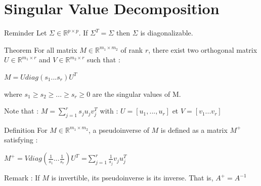 \documentclass[unknownkeysallowed]{beamer}
\begin{document}
\section{Singular Value Decomposition}
\label{sec:conclusion}

\begin{frame}
\begin{block}{Reminder}
Let $\Sigma\in\mathbb{R}^{p \times p}$.
\newline
If   $\Sigma^T=\Sigma$ then $\Sigma$ is diagonalizable.
\end{block}
\begin{alertblock}{Theorem}
For all matrix $M\in\mathbb{R}^{m_1 \times m_2}$ of rank $r$, there exist two orthogonal matrix $U\in \mathbb{R}^{m_1 \times r}$ and $V\in\mathbb{R}^{m_2 \times r}$ such that :
\begin{center}
    $M=U diag(s_{1}...s_{r})U^T$
\end{center}
where $s_{1}\ge s_{2} \ge ... \ge s_{r} \ge 0$ are the singular values of M.
\end{alertblock}
\vspace{0.5cm}
Note that : $M=\sum\limits_{j=1}^r s_{j}u_{j}v_{j}^T$ with : $U=[u_{1},...,u_{r}]$
et $V=[v_{1} ... v_{r}]$
\end{frame}

\begin{frame}
\begin{block}{Definition}
For $M\in\mathbb{R}^{m_1 \times m_2}$, a pseudoinverse of $M$ is defined as a matrix $M^{+}$ satisfying :
\begin{center}
    $M^{+}=Vdiag(\frac{1}{s_{1}} ... \frac{1}{s_{r}})U^T$
    =$\sum\limits_{j=1}^r \frac{1}{s_{j}}v_{j}u_{j}^T$
\end{center}
\end{block}
\vspace{0.5cm}
Remark : If $M$ is invertible, its pseudoinverse is its inverse. That is, $A^{+}=A^{-1}$
\end{frame}
\end{document}
